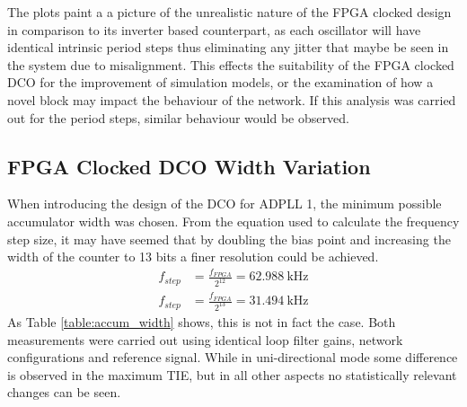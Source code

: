 The plots paint a a picture of the unrealistic nature of the \ac{FPGA} clocked design in comparison to its inverter based counterpart, as each oscillator will have identical intrinsic period steps thus eliminating any jitter that maybe be seen in the system due to misalignment.
This effects the suitability of the FPGA clocked \ac{DCO} for the improvement of simulation models, or the examination of how a novel block may impact the behaviour of the network. If this analysis was carried out for the period steps, similar behaviour would be observed.


\subsection{\ac{FPGA} Clocked \ac{DCO} Width Variation}
When introducing the design of the \ac{DCO} for \ac{ADPLL} 1, the minimum possible accumulator width was chosen. From the equation used to calculate the frequency step size, it may have seemed that by doubling the bias point and increasing the width of the counter to 13 bits a finer resolution could be achieved.
\begin{align}
f_{step} &= \frac{f_{FPGA}}{2^{12}} = 62.988~\si{\kilo\hertz} \\
f_{step} &= \frac{f_{FPGA}}{2^{13}} = 31.494~\si{\kilo\hertz}
\end{align}
As Table \ref{table:accum_width} shows, this is not in fact the case. Both measurements were carried out using identical loop filter gains, network configurations and reference signal. While in uni-directional mode some difference is observed in the maximum \ac{TIE}, but in all other aspects no statistically relevant changes can be seen.

